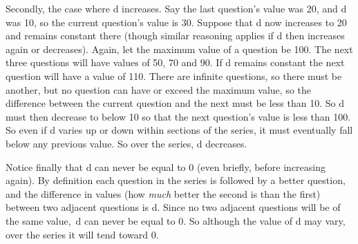 Secondly, the case where d increases.
Say the last question's value was 20, and d was 10, so the current question's value is 30.
Suppose that d now increases to 20 and remains constant there (though similar reasoning applies if d then increases again or decreases).
Again, let the maximum value of a question be 100.
The next three questions will have values of 50, 70 and 90.
If d remains constant the next question will have a value of 110.
There are infinite questions, so there must be another, but no question can have or exceed the maximum value, so the difference between the current question and the next must be less than 10.
So d must then decrease to below 10 so that the next question's value is less than 100.
So even if d varies up or down within sections of the series, it must eventually fall below any previous value.
So over the series, d decreases.

Notice finally that d can never be equal to 0 (even briefly, before increasing again).
By definition each question in the series is followed by a better question, and the difference in values (how \emph{much} better the second is than the first) between two adjacent questions is d.
Since no two adjacent questions will be of the same value,\footnotemark\ d can never be equal to 0.
So although the value of d may vary, over the series it will tend toward 0.



